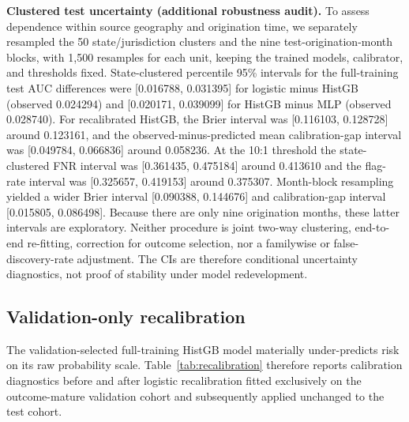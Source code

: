 \documentclass[10pt]{article}
\begin{document}
\noindent\textbf{Clustered test uncertainty (additional robustness audit).} To assess dependence within source geography and origination time, we separately resampled the 50 state/jurisdiction clusters and the nine test-origination-month blocks, with 1,500 resamples for each unit, keeping the trained models, calibrator, and thresholds fixed. State-clustered percentile 95\% intervals for the full-training test AUC differences were [0.016788, 0.031395] for logistic minus HistGB (observed 0.024294) and [0.020171, 0.039099] for HistGB minus MLP (observed 0.028740). For recalibrated HistGB, the Brier interval was [0.116103, 0.128728] around 0.123161, and the observed-minus-predicted mean calibration-gap interval was [0.049784, 0.066836] around 0.058236. At the 10:1 threshold the state-clustered FNR interval was [0.361435, 0.475184] around 0.413610 and the flag-rate interval was [0.325657, 0.419153] around 0.375307. Month-block resampling yielded a wider Brier interval [0.090388, 0.144676] and calibration-gap interval [0.015805, 0.086498]. Because there are only nine origination months, these latter intervals are exploratory. Neither procedure is joint two-way clustering, end-to-end re-fitting, correction for outcome selection, nor a familywise or false-discovery-rate adjustment. The CIs are therefore conditional uncertainty diagnostics, not proof of stability under model redevelopment.

\subsection{Validation-only recalibration}

\label{sec:recalibration}

The validation-selected full-training HistGB model materially under-predicts risk on its raw probability scale. Table~\ref{tab:recalibration} therefore reports calibration diagnostics before and after logistic recalibration fitted exclusively on the outcome-mature validation cohort and subsequently applied unchanged to the test cohort.
\end{document}
